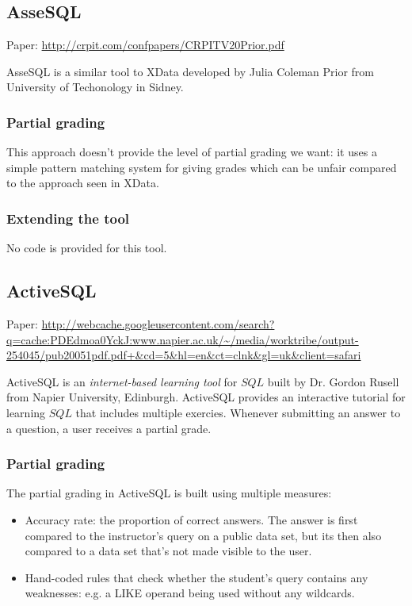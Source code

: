 \subsection{AsseSQL}

Paper: \url{http://crpit.com/confpapers/CRPITV20Prior.pdf}

AsseSQL is a similar tool to XData developed by Julia Coleman Prior from University of Techonology in Sidney.

\subsubsection*{Partial grading}
This approach doesn't provide the level of partial grading we want: it uses a simple pattern matching system for giving grades which can be unfair compared to the approach seen in XData.

\subsubsection*{Extending the tool}
No code is provided for this tool.

\subsection{ActiveSQL}

Paper: \url{http://webcache.googleusercontent.com/search?q=cache:PDEdmoa0YckJ:www.napier.ac.uk/~/media/worktribe/output-254045/pub20051pdf.pdf+&cd=5&hl=en&ct=clnk&gl=uk&client=safari}

ActiveSQL is an \textit{internet-based learning tool} for $SQL$ built by Dr. Gordon Rusell from Napier University, Edinburgh. ActiveSQL provides an interactive tutorial for learning $SQL$ that includes multiple exercies. Whenever submitting an answer to a question, a user receives a partial grade.

\subsubsection*{Partial grading}
The partial grading in ActiveSQL is built using multiple measures:
\begin{itemize}
    \item Accuracy rate: the proportion of correct answers. The answer is first compared to the instructor's query on a public data set, but its then also compared to a data set that's not made visible to the user.
    \item Hand-coded rules that check whether the student's query contains any weaknesses: e.g. a LIKE operand being used without any wildcards.
\end{itemize}

